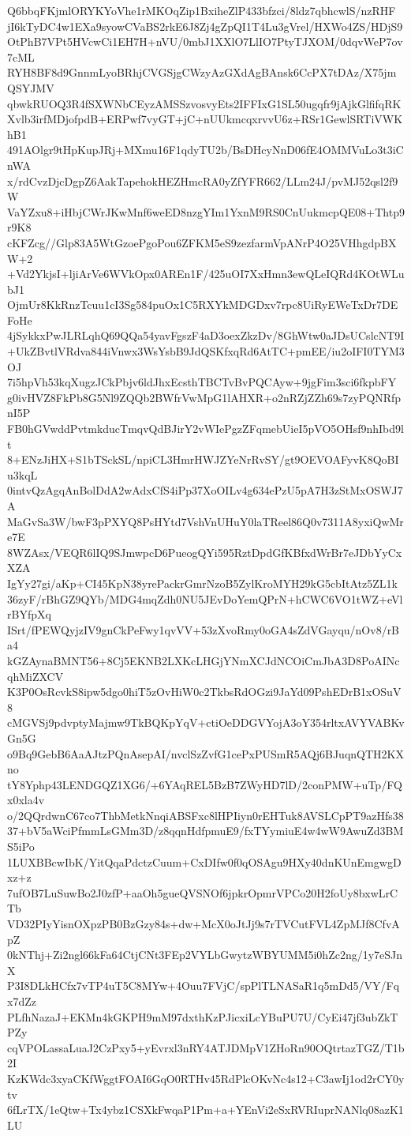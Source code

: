 Q6bbqFKjmlORYKYoVhe1rMKOqZip1BxiheZlP433bfzci/8ldz7qbhcwlS/nzRHF
jI6kTyDC4w1EXa9syowCVaBS2rkE6J8Zj4gZpQI1T4Lu3gVrel/HXWo4ZS/HDjS9
OtPhB7VPt5HVcwCi1EH7H+nVU/0mbJ1XXlO7LlIO7PtyTJXOM/0dqvWeP7ov7cML
RYH8BF8d9GnnmLyoBRhjCVGSjgCWzyAzGXdAgBAnsk6CcPX7tDAz/X75jmQSYJMV
qbwkRUOQ3R4fSXWNbCEyzAMSSzvosvyEts2IFFIxG1SL50ugqfr9jAjkGlfifqRK
Xvlb3irfMDjofpdB+ERPwf7vyGT+jC+nUUkmcqxrvvU6z+RSr1GewlSRTiVWKhB1
491AOlgr9tHpKupJRj+MXmu16F1qdyTU2b/BsDHcyNnD06fE4OMMVuLo3t3iCnWA
x/rdCvzDjcDgpZ6AakTapehokHEZHmcRA0yZfYFR662/LLm24J/pvMJ52qsl2f9W
VaYZxu8+iHbjCWrJKwMnf6weED8nzgYIm1YxnM9RS0CnUukmcpQE08+Thtp9r9K8
cKFZcg//Glp83A5WtGzoePgoPou6ZFKM5eS9zezfarmVpANrP4O25VHhgdpBXW+2
+Vd2YkjsI+ljiArVe6WVkOpx0AREn1F/425uOI7XxHmn3ewQLeIQRd4KOtWLubJ1
OjmUr8KkRnzTcuu1cI3Sg584puOx1C5RXYkMDGDxv7rpc8UiRyEWeTxDr7DEFoHe
4jSykkxPwJLRLqhQ69QQa54yavFgszF4aD3oexZkzDv/8GhWtw0aJDsUCslcNT9I
+UkZBvtlVRdva844iVnwx3WsYsbB9JdQSKfxqRd6AtTC+pmEE/iu2oIFI0TYM3OJ
7i5hpVh53kqXugzJCkPbjv6ldJhxEcsthTBCTvBvPQCAyw+9jgFim3sci6fkpbFY
g0ivHVZ8FkPb8G5Nl9ZQQb2BWfrVwMpG1lAHXR+o2nRZjZZh69s7zyPQNRfpnI5P
FB0hGVwddPvtmkducTmqvQdBJirY2vWIePgzZFqmebUieI5pVO5OHsf9nhIbd9lt
8+ENzJiHX+S1bTSckSL/npiCL3HmrHWJZYeNrRvSY/gt9OEVOAFyvK8QoBIu3kqL
0intvQzAgqAnBolDdA2wAdxCfS4iPp37XoOILv4g634ePzU5pA7H3zStMxOSWJ7A
MaGvSa3W/bwF3pPXYQ8PsHYtd7VshVnUHuY0laTReel86Q0v7311A8yxiQwMre7E
8WZAsx/VEQR6lIQ9SJmwpcD6PueogQYi595RztDpdGfKBfxdWrBr7eJDbYyCxXZA
IgYy27gi/aKp+CI45KpN38yrePackrGmrNzoB5ZylKroMYH29kG5cbItAtz5ZL1k
36zyF/rBhGZ9QYb/MDG4mqZdh0NU5JEvDoYemQPrN+hCWC6VO1tWZ+eVlrBYfpXq
ISrt/fPEWQyjzIV9gnCkPeFwy1qvVV+53zXvoRmy0oGA4sZdVGayqu/nOv8/rBa4
kGZAynaBMNT56+8Cj5EKNB2LXKcLHGjYNmXCJdNCOiCmJbA3D8PoAINcqhMiZXCV
K3P0OsRcvkS8ipw5dgo0hiT5zOvHiW0c2TkbsRdOGzi9JaYd09PshEDrB1xOSuV8
cMGVSj9pdvptyMajmw9TkBQKpYqV+ctiOeDDGVYojA3oY354rltxAVYVABKvGn5G
o9Bq9GebB6AaAJtzPQnAsepAI/nvclSzZvfG1cePxPUSmR5AQj6BJuqnQTH2KXno
tY8Yphp43LENDGQZ1XG6/+6YAqREL5BzB7ZWyHD7lD/2conPMW+uTp/FQx0xla4v
o/2QQrdwnC67co7ThbMetkNnqiABSFxc8lHPIiyn0rEHTuk8AVSLCpPT9azHfs38
37+bV5aWciPfmmLsGMm3D/z8qqnHdfpmuE9/fxTYymiuE4w4wW9AwuZd3BMS5iPo
1LUXBBcwIbK/YitQqaPdctzCuum+CxDIfw0f0qOSAgu9HXy40dnKUnEmgwgDxz+z
7ufOB7LuSuwBo2J0zfP+aaOh5gueQVSNOf6jpkrOpmrVPCo20H2foUy8bxwLrCTb
VD32PIyYisnOXpzPB0BzGzy84s+dw+McX0oJtJj9s7rTVCutFVL4ZpMJf8CfvApZ
0kNThj+Zi2ngl66kFa64CtjCNt3FEp2VYLbGwytzWBYUMM5i0hZc2ng/1y7eSJnX
P3I8DLkHCfx7vTP4uT5C8MYw+4Ouu7FVjC/spPlTLNASaR1q5mDd5/VY/Fqx7dZz
PLfhNazaJ+EKMn4kGKPH9mM97dxthKzPJicxiLcYBuPU7U/CyEi47jf3ubZkTPZy
cqVPOLassaLuaJ2CzPxy5+yEvrxl3nRY4ATJDMpV1ZHoRn90OQtrtazTGZ/T1b2I
KzKWdc3xyaCKfWggtFOAI6GqO0RTHv45RdPlcOKvNc4s12+C3awIj1od2rCY0ytv
6fLrTX/1eQtw+Tx4ybz1CSXkFwqaP1Pm+a+YEnVi2eSxRVRIuprNANlq08azK1LU
